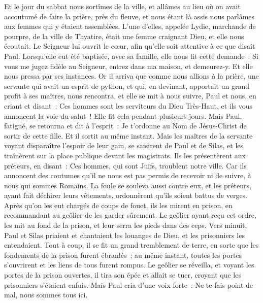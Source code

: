 \begin{multicols}{2}
Et le jour du sabbat nous sortîmes de la ville, et allâmes au lieu où on avait accoutumé de faire la prière, près du fleuve, et nous étant là assis nous parlâmes aux femmes qui y étaient assemblées.
L'une d'elles, appelée Lydie, marchande de pourpre, de la ville de Thyatire, était une femme craignant Dieu, et elle nous écoutait. Le Seigneur lui ouvrit le cœur, afin qu'elle soit attentive à ce que disait Paul.
Lorsqu'elle eut été baptisée, avec sa famille, elle nous fit cette demande~: Si vous me jugez fidèle au Seigneur, entrez dans ma maison, et demeurez-y. Et elle nous pressa par ses instances.
Or il arriva que comme nous allions à la prière, une servante qui avait un esprit de python, et qui, en devinant, apportait un grand profit à ses maîtres, nous rencontra,
et elle se mit à nous suivre, Paul et nous, en criant et disant~: Ces hommes sont les serviteurs du Dieu Très-Haut, et ils vous annoncent la voie du salut~!
Elle fit cela pendant plusieurs jours. Mais Paul, fatigué, se retourna et dit à l'esprit~: Je t'ordonne au Nom de Jésus-Christ de sortir de cette fille. Et il sortit au même instant.
Mais les maîtres de la servante voyant disparaître l'espoir de leur gain, se saisirent de Paul et de Silas, et les traînèrent sur la place publique devant les magistrats.
Ils les présentèrent aux préteurs, en disant~: Ces hommes, qui sont Juifs, troublent notre ville.
Car ils annoncent des coutumes qu'il ne nous est pas permis de recevoir ni de suivre, à nous qui sommes Romains.
La foule se souleva aussi contre eux, et les préteurs, ayant fait déchirer leurs vêtements, ordonnèrent qu'ils soient battus de verges.
Après qu'on les eut chargés de coups de fouet, ils les mirent en prison, en recommandant au geôlier de les garder sûrement.
Le geôlier ayant reçu cet ordre, les mit au fond de la prison, et leur serra les pieds dans des ceps.
Vers minuit, Paul et Silas priaient et chantaient les louanges de Dieu, et les prisonniers les entendaient.
Tout à coup, il se fit un grand tremblement de terre, en sorte que les fondements de la prison furent ébranlés~; au même instant, toutes les portes s'ouvrirent et les liens de tous furent rompus.
Le geôlier se réveilla, et voyant les portes de la prison ouvertes, il tira son épée et allait se tuer, croyant que les prisonniers s'étaient enfuis.
Mais Paul cria d'une voix forte~: Ne te fais point de mal, nous sommes tous ici.

\end{multicols}

